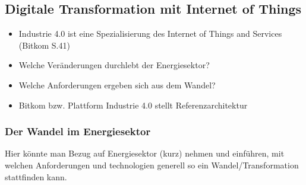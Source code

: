\subsection{Digitale Transformation mit Internet of Things}
\begin{itemize}
  \item Industrie 4.0 ist eine Spezialisierung des Internet of Things and Services (Bitkom S.41)
  \item Welche Veränderungen durchlebt der Energiesektor?
  \item Welche Anforderungen ergeben sich aus dem Wandel?
  \item Bitkom bzw. Plattform Industrie 4.0 stellt Referenzarchitektur
\end{itemize}

\subsubsection{Der Wandel im Energiesektor}
Hier könnte man Bezug auf Energiesektor (kurz) nehmen und einführen, mit welchen Anforderungen und technologien generell so ein Wandel/Transformation stattfinden kann.
